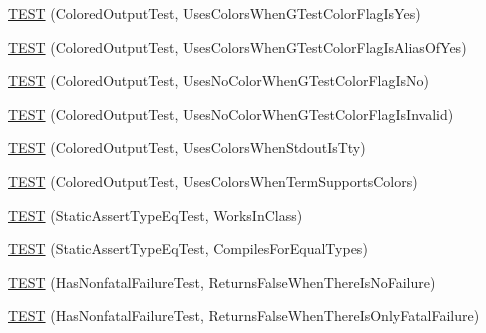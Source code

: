 \begin{DoxyCompactItemize}
\item 
\mbox{\hyperlink{_obj__test_2lib_2googletest-master_2googletest_2test_2gtest__unittest_8cc_aaf1acc03f393989f85aafd13c880fa44}{T\+E\+ST}} (Colored\+Output\+Test, Uses\+Colors\+When\+G\+Test\+Color\+Flag\+Is\+Yes)
\item 
\mbox{\hyperlink{_obj__test_2lib_2googletest-master_2googletest_2test_2gtest__unittest_8cc_aa9a0db525d07d5e2afea545471d1f654}{T\+E\+ST}} (Colored\+Output\+Test, Uses\+Colors\+When\+G\+Test\+Color\+Flag\+Is\+Alias\+Of\+Yes)
\item 
\mbox{\hyperlink{_obj__test_2lib_2googletest-master_2googletest_2test_2gtest__unittest_8cc_aac5bec0b24eebf52985abcd6234335fe}{T\+E\+ST}} (Colored\+Output\+Test, Uses\+No\+Color\+When\+G\+Test\+Color\+Flag\+Is\+No)
\item 
\mbox{\hyperlink{_obj__test_2lib_2googletest-master_2googletest_2test_2gtest__unittest_8cc_a7f15883b04b4975f604be288955952fb}{T\+E\+ST}} (Colored\+Output\+Test, Uses\+No\+Color\+When\+G\+Test\+Color\+Flag\+Is\+Invalid)
\item 
\mbox{\hyperlink{_obj__test_2lib_2googletest-master_2googletest_2test_2gtest__unittest_8cc_a2a995937bc9d0b16d65e5bcaa5fc781e}{T\+E\+ST}} (Colored\+Output\+Test, Uses\+Colors\+When\+Stdout\+Is\+Tty)
\item 
\mbox{\hyperlink{_obj__test_2lib_2googletest-master_2googletest_2test_2gtest__unittest_8cc_a6dd6677e63340771dc55ad96a0697f11}{T\+E\+ST}} (Colored\+Output\+Test, Uses\+Colors\+When\+Term\+Supports\+Colors)
\item 
\mbox{\hyperlink{_obj__test_2lib_2googletest-master_2googletest_2test_2gtest__unittest_8cc_a267c6521e900e2d6096653f1b0df7f32}{T\+E\+ST}} (Static\+Assert\+Type\+Eq\+Test, Works\+In\+Class)
\item 
\mbox{\hyperlink{_obj__test_2lib_2googletest-master_2googletest_2test_2gtest__unittest_8cc_a896a075b2d244e3961f0fb3c13614f2b}{T\+E\+ST}} (Static\+Assert\+Type\+Eq\+Test, Compiles\+For\+Equal\+Types)
\item 
\mbox{\hyperlink{_obj__test_2lib_2googletest-master_2googletest_2test_2gtest__unittest_8cc_a9f9166027da63504b2306b8f5e5a88b1}{T\+E\+ST}} (Has\+Nonfatal\+Failure\+Test, Returns\+False\+When\+There\+Is\+No\+Failure)
\item 
\mbox{\hyperlink{_obj__test_2lib_2googletest-master_2googletest_2test_2gtest__unittest_8cc_ad25e0382fb27cfff590e2c104c504dff}{T\+E\+ST}} (Has\+Nonfatal\+Failure\+Test, Returns\+False\+When\+There\+Is\+Only\+Fatal\+Failure)
\item 

\end{DoxyCompactItemize}
